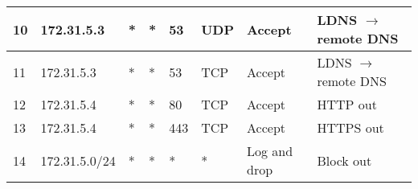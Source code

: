 \documentclass[a4paper, 11pt, oneside]{article}
\begin{document}
\begin{table}[H]
{\begin{tabular}{|llllllll|}
\multicolumn{1}{|l|}{10}          & \multicolumn{1}{l|}{172.31.5.3}                                                   & \multicolumn{1}{l|}{*}                                                              & \multicolumn{1}{l|}{*}                                                                 & \multicolumn{1}{l|}{53}                                                                  & \multicolumn{1}{l|}{UDP}               & \multicolumn{1}{l|}{Accept}          & LDNS $\rightarrow$ remote DNS   \\ \hline
\multicolumn{1}{|l|}{11}          & \multicolumn{1}{l|}{172.31.5.3}                                                   & \multicolumn{1}{l|}{*}                                                              & \multicolumn{1}{l|}{*}                                                                 & \multicolumn{1}{l|}{53}                                                                  & \multicolumn{1}{l|}{TCP}               & \multicolumn{1}{l|}{Accept}          & LDNS $\rightarrow$ remote DNS   \\ \hline
\multicolumn{1}{|l|}{12}          & \multicolumn{1}{l|}{172.31.5.4}                                                   & \multicolumn{1}{l|}{*}                                                              & \multicolumn{1}{l|}{*}                                                                 & \multicolumn{1}{l|}{80}                                                                  & \multicolumn{1}{l|}{TCP}               & \multicolumn{1}{l|}{Accept}          & HTTP out                               \\ \hline
\multicolumn{1}{|l|}{13}          & \multicolumn{1}{l|}{172.31.5.4}                                                   & \multicolumn{1}{l|}{*}                                                              & \multicolumn{1}{l|}{*}                                                                 & \multicolumn{1}{l|}{443}                                                                 & \multicolumn{1}{l|}{TCP}               & \multicolumn{1}{l|}{Accept}          & HTTPS out                              \\ \hline
\multicolumn{1}{|l|}{14}          & \multicolumn{1}{l|}{172.31.5.0/24}                                                & \multicolumn{1}{l|}{*}                                                              & \multicolumn{1}{l|}{*}                                                                 & \multicolumn{1}{l|}{*}                                                                   & \multicolumn{1}{l|}{*}                 & \multicolumn{1}{l|}{Log and drop}    & Block out                              \\ \hline

\end{tabular}}
\end{table}
\end{document}
